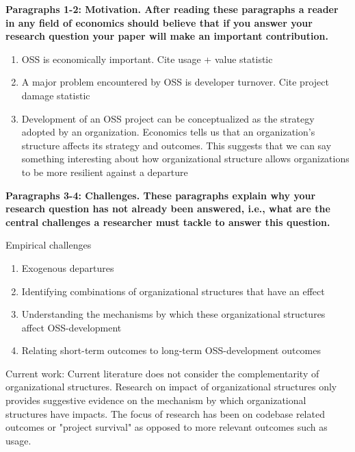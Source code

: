 \documentclass[source/paper/main.tex]{subfiles}
\begin{document}
\textbf{Paragraphs 1-2: Motivation. After reading these paragraphs a reader in any field of economics should believe that if you answer your research question your paper will make an important contribution.}

\begin{enumerate}
    \item OSS is economically important. Cite usage + value statistic
    \item A major problem encountered by OSS is developer turnover. Cite project damage statistic 
    \item Development of an OSS project can be conceptualized as the strategy adopted by an organization. Economics tells us that an organization's structure affects its strategy and outcomes. This suggests that we can say something interesting about how organizational structure allows organizations to be more resilient against a departure
\end{enumerate}

\textbf{Paragraphs 3-4: Challenges. These paragraphs explain why your research question has not already been answered, i.e., what are the central challenges a researcher must tackle to answer this question.}

Empirical challenges
\begin{enumerate}
    \item Exogenous departures
    \item Identifying combinations of organizational structures that have an effect 
    \item Understanding the mechanisms by which these organizational structures affect OSS-development
    \item Relating short-term outcomes to long-term OSS-development outcomes
\end{enumerate}
Current work: Current literature does not consider the complementarity of organizational structures. Research on impact of organizational structures only provides suggestive evidence on the mechanism by which organizational structures have impacts. The focus of research has been on codebase related outcomes or "project survival" as opposed to more relevant outcomes such as usage. 
\end{document}
